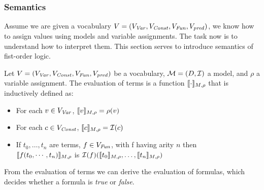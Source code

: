 \subsubsection{Semantics}
Assume we are given a vocabulary $V = (V_{\mathit{Var}}, V_{\mathit{Const}}, V_{\mathit{Fun}}, V_{\mathit{pred}})$, we know how to assign values using models and variable assignments. The task now is to understand how to interpret them. This section serves to introduce semantics of fist-order logic.
\begin{mydef}
	Let $V = (V_{\mathit{Var}}, V_{\mathit{Const}}, V_{\mathit{Fun}}, V_{\mathit{pred}})$ be a vocabulary, $\mathcal{M} = (D, \mathcal{I})$ a model, and $\rho$ a variable assignment. The evaluation of terms is a function $\llbracket \cdot \rrbracket_{M, \rho}$ that is inductively defined as:
	\begin{itemize}
		\item For each $v \in V_{\mathit{Var}}$, $\llbracket v \rrbracket_{M, \rho} = \rho(v)$
		\item For each $c \in V_{\mathit{Const}}$, $\llbracket c \rrbracket_{M, \rho} = \mathcal{I}(c)$
		\item If $t_0, \ldots, t_n$ are terms, $f \in V_{\mathit{Fun}}$, with f having arity $n$ then \\ $\llbracket f(t_0, \cdots, t_n) \rrbracket_{M, \rho}$ is $\mathcal{I}(f)(\llbracket t_0 \rrbracket_{M, \rho}, \ldots, \llbracket t_n \rrbracket_{M, \rho})$
	\end{itemize}
\end{mydef}
From the evaluation of terms we can derive the evaluation of formulas, which decides whether a formula is \textsl{true} or \textsl{false}.

